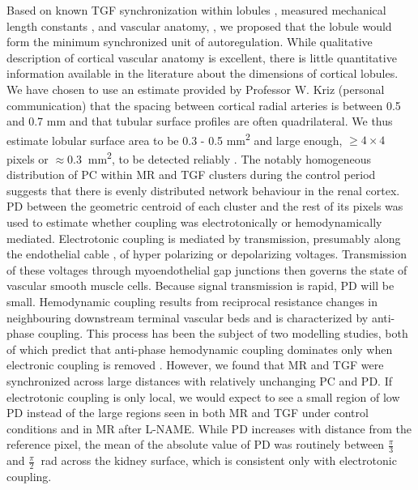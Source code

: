 	Based on known TGF synchronization within lobules \cite{HolsteinRathlou87,Yip92,Chen95}, measured mechanical length constants \cite{Wagner97}, and vascular anatomy, \cite{Braus24,Beeuwkes75}, we proposed that the lobule would form the minimum synchronized unit of autoregulation. While qualitative description of cortical vascular anatomy is excellent, there is little quantitative information available in the literature about the dimensions of cortical lobules. We have chosen to use an estimate provided by Professor W. Kriz (personal communication) that the spacing between cortical radial arteries is between 0.5 and 0.7 mm and that tubular surface profiles are often quadrilateral. We thus estimate lobular surface area to be 0.3 - 0.5 mm\textsuperscript{2} and large enough, $\geq 4\times 4 \ $ pixels or $\approx 0.3 \ $ mm\textsuperscript{2}, to be detected reliably \cite{Scully14}. The notably homogeneous distribution of PC within MR and TGF clusters during the control period suggests that there is evenly distributed network behaviour in the renal cortex. PD between the geometric centroid of each cluster and the rest of its pixels was used to estimate whether coupling was electrotonically or hemodynamically mediated. Electrotonic coupling is mediated by transmission, presumably along the endothelial cable \cite{Diep05}, of hyper polarizing or depolarizing voltages. Transmission of these voltages through myoendothelial gap junctions then governs the state of vascular smooth muscle cells. Because signal transmission is rapid, PD will be small. Hemodynamic coupling results from reciprocal resistance changes in neighbouring downstream terminal vascular beds \cite{Moore94} and is characterized by anti-phase coupling. This process has been the subject of two modelling studies, both of which predict that anti-phase hemodynamic coupling dominates only when electronic coupling is removed \cite{Marsh13,Postnov12}. However, we found that MR and TGF were synchronized across large distances with relatively unchanging PC and PD. If electrotonic coupling is only local, we would expect to see a small region of low PD instead of the large regions seen in both MR and TGF under control conditions and in MR after L-NAME. While PD increases with distance from the reference pixel, the mean of the absolute value of PD was routinely between $\frac{\pi}{3} \ $ and  $\frac{\pi}{2} \ $ rad across the kidney surface, which is consistent only with electrotonic coupling.
	
